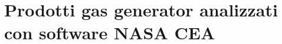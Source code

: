\section{Prodotti gas generator analizzati con software NASA CEA}
\label{appendix:prodotti gas generator}

